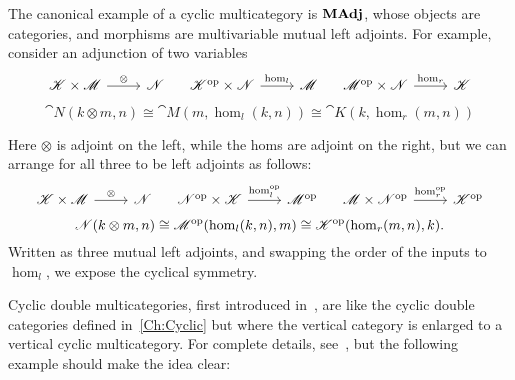 The canonical example of a cyclic multicategory is $\mathbf{MAdj}$, whose objects are categories, and morphisms are multivariable mutual left adjoints. For example, consider an adjunction of two variables
\[
\begin{tikzcd}
	\cat{K}\times \cat{M} \rar{\otimes} & \cat{N}
\end{tikzcd}
\quad
\begin{tikzcd}
	\op{\cat{K}}\times \cat{N} \rar{\hom_l} & \cat{M}
\end{tikzcd}
\quad
\begin{tikzcd}
	\op{\cat{M}}\times \cat{N} \rar{\hom_r} & \cat{K}
\end{tikzcd}
\]
\[
	\cat{N}(k\otimes m,n) \cong \cat{M}(m,\hom_l(k,n)) \cong \cat{K}(k,\hom_r(m,n))
\]

Here $\otimes$ is adjoint on the left, while the homs are adjoint on the right, but we can arrange for all three to be left adjoints as follows:
\[
\begin{tikzcd}
	\cat{K}\times \cat{M} \rar{\otimes} & \cat{N}
\end{tikzcd}
\quad
\begin{tikzcd}
	\op{\cat{N}}\times \cat{K} \rar{\hom_l^{\text{op}}} & \op{\cat{M}}
\end{tikzcd}
\quad
\begin{tikzcd}
	\cat{M}\times \op{\cat{N}} \rar{\hom_r^{\text{op}}} & \op{\cat{K}}
\end{tikzcd}
\]
\[
	\mathscr{N}(k\otimes m,n) \cong {\mathscr{M}}^{\text{op}}(\hom_l(k,n),m) \cong {\mathscr{K}}^{\text{op}}(\hom_r(m,n),k).
\]
Written as three mutual left adjoints, and swapping the order of the inputs to $\hom_l$, we expose the cyclical symmetry.

Cyclic double multicategories, first introduced in~\cite{cgr:mates}, are like the cyclic double categories defined in~\ref{Ch:Cyclic} but where the vertical category is enlarged to a vertical cyclic multicategory. For complete details, see~\cite{cgr:mates}, but the following example should make the idea clear:

